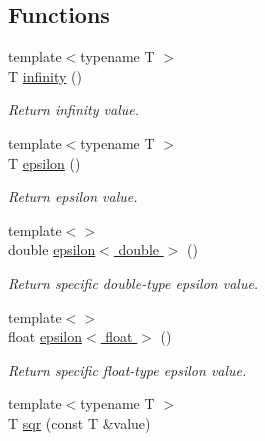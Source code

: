 \subsection*{Functions}
\begin{DoxyCompactItemize}
\item 
\mbox{\label{namespaceacme_abaa8d891da65dcd3583b49a74a5070bf}} 
{\footnotesize template$<$typename T $>$ }\\T \hyperlink{namespaceacme_abaa8d891da65dcd3583b49a74a5070bf}{infinity} ()
\begin{DoxyCompactList}\small\item\em Return infinity value. \end{DoxyCompactList}\item 
\mbox{\label{namespaceacme_a271df552fb3ed0b0552ec753f179b086}} 
{\footnotesize template$<$typename T $>$ }\\T \hyperlink{namespaceacme_a271df552fb3ed0b0552ec753f179b086}{epsilon} ()
\begin{DoxyCompactList}\small\item\em Return epsilon value. \end{DoxyCompactList}\item 
\mbox{\label{namespaceacme_ac0dc78bf61c8c5c10b1825cf9e8c1290}} 
{\footnotesize template$<$$>$ }\\double \hyperlink{namespaceacme_ac0dc78bf61c8c5c10b1825cf9e8c1290}{epsilon$<$ double $>$} ()
\begin{DoxyCompactList}\small\item\em Return specific double-\/type epsilon value. \end{DoxyCompactList}\item 
\mbox{\label{namespaceacme_aa51a72841e708a201a31ddfe592b990f}} 
{\footnotesize template$<$$>$ }\\float \hyperlink{namespaceacme_aa51a72841e708a201a31ddfe592b990f}{epsilon$<$ float $>$} ()
\begin{DoxyCompactList}\small\item\em Return specific float-\/type epsilon value. \end{DoxyCompactList}\item 
{\footnotesize template$<$typename T $>$ }\\T \hyperlink{namespaceacme_a722297e283d0b656d1b3f64222acb175}{sqr} (const T \&value)

\end{DoxyCompactItemize}
